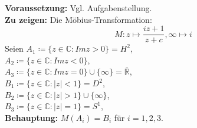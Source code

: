\begin{problem*}[4]
  \textbf{Voraussetzung:} Vgl. Aufgabenstellung. \\
  \textbf{Zu zeigen:} Die Möbius-Transformation:
  \begin{equation*}
    M: z \mapsto \frac{iz + 1}{z + c}, \infty \mapsto i
  \end{equation*}
  Seien \( A_1 \coloneqq \{ z \in \mathbb{C}: Im z > 0 \} = H^2 \), \\
  \( A_2 \coloneqq \{ z \in \mathbb{C}: Im z < 0 \} \),\\
  \( A_3 \coloneqq \{ z \in \mathbb{C}: Im z = 0 \} \cup \{ \infty \} = \bar{\mathbb{R}} \),\\
  \( B_1 \coloneqq \{ z \in \mathbb{C} : \vert z \vert < 1\} = D^2 \), \\
  \( B_2 \coloneqq \{ z \in \mathbb{C} : \vert z \vert > 1\} \cup \{ \infty \} \),\\
  \( B_3 \coloneqq \{ z \in \mathbb{C} : \vert z \vert = 1\} = S^1 \),\\
  \textbf{Behauptung:} \( M(A_i) = B_i \) für \( i = 1, 2, 3 \).
  

\end{problem*}

